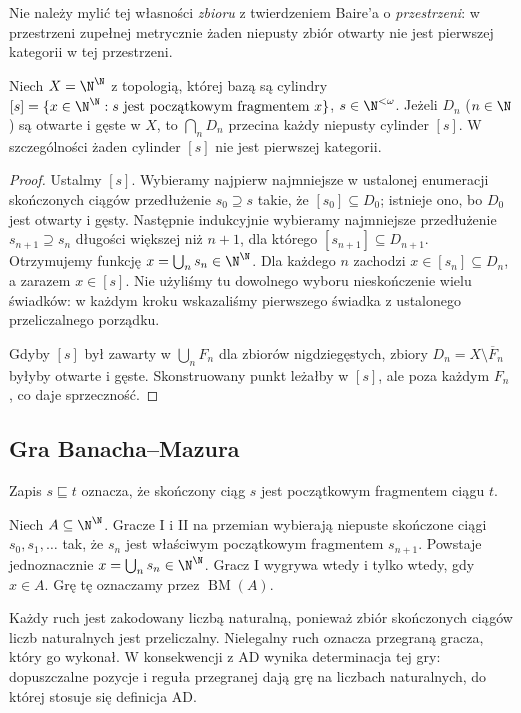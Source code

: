 Nie należy mylić tej własności \emph{zbioru} z twierdzeniem
Baire'a o \emph{przestrzeni}: w przestrzeni zupełnej
metrycznie żaden niepusty zbiór otwarty nie jest
pierwszej kategorii w tej przestrzeni.

\begin{lemat}
\label{lem:ad-baire-category}
Niech $X=\N^\N$ z topologią, której bazą są cylindry
$[s]=\{x\in\N^\N:s\text{ jest początkowym fragmentem }x\}$,
$s\in\N^{<\omega}$. Jeżeli $D_n$ ($n\in\N$) są otwarte
i gęste w $X$, to $\bigcap_nD_n$ przecina każdy niepusty
cylinder $[s]$. W szczególności żaden cylinder $[s]$
nie jest pierwszej kategorii.
\end{lemat}
\begin{proof}
Ustalmy $[s]$. Wybieramy najpierw najmniejsze w ustalonej
enumeracji skończonych ciągów przedłużenie $s_0\supseteq s$
takie, że $[s_0]\subseteq D_0$; istnieje ono, bo $D_0$
jest otwarty i gęsty. Następnie indukcyjnie wybieramy
najmniejsze przedłużenie $s_{n+1}\supseteq s_n$ długości
większej niż $n+1$, dla którego $[s_{n+1}]\subseteq D_{n+1}$.
Otrzymujemy funkcję $x=\bigcup_ns_n\in\N^\N$.
Dla każdego $n$ zachodzi $x\in[s_n]\subseteq D_n$,
a zarazem $x\in[s]$. Nie użyliśmy tu dowolnego wyboru
nieskończenie wielu świadków: w każdym kroku wskazaliśmy
pierwszego świadka z ustalonego przeliczalnego porządku.

Gdyby $[s]$ był zawarty w $\bigcup_nF_n$ dla zbiorów
nigdziegęstych, zbiory $D_n=X\setminus\overline F_n$
byłyby otwarte i gęste. Skonstruowany punkt leżałby
w $[s]$, ale poza każdym $F_n$, co daje sprzeczność.
\end{proof}

\subsection{Gra Banacha--Mazura}
Zapis $s\sqsubseteq t$ oznacza, że skończony ciąg $s$
jest początkowym fragmentem ciągu $t$.
\begin{definicja}
\label{def:ad-banach-mazur}
Niech $A\subseteq\N^\N$. Gracze I i II na przemian
wybierają niepuste skończone ciągi $s_0,s_1,\ldots$
tak, że $s_n$ jest właściwym początkowym fragmentem
$s_{n+1}$. Powstaje jednoznacznie $x=\bigcup_ns_n\in\N^\N$.
Gracz I wygrywa wtedy i tylko wtedy, gdy $x\in A$.
Grę tę oznaczamy przez $\operatorname{BM}(A)$.
\end{definicja}
Każdy ruch jest zakodowany liczbą naturalną, ponieważ zbiór
skończonych ciągów liczb naturalnych jest przeliczalny.
Nielegalny ruch oznacza przegraną gracza, który go wykonał.
W konsekwencji z $\mathrm{AD}$ wynika determinacja tej gry:
dopuszczalne pozycje i reguła przegranej dają grę na
liczbach naturalnych, do której stosuje się definicja AD.

